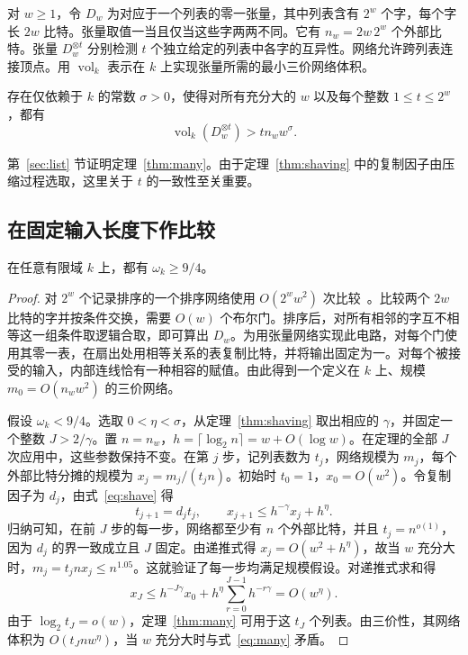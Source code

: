对 \(w\ge1\)，令 \(D_w\) 为对应于一个列表的零一张量，其中列表含有 \(2^w\) 个字，每个字长 \(2w\) 比特。张量取值一当且仅当这些字两两不同。它有 \(n_w=2w\,2^w\) 个外部比特。张量 \(D_w^{\otimes t}\) 分别检测 \(t\) 个独立给定的列表中各字的互异性。网络允许跨列表连接顶点。用 \(\operatorname{vol}_k\) 表示在 \(k\) 上实现张量所需的最小三价网络体积。

\begin{theorem}[列表互异性检测的体积]\label{thm:many}
存在仅依赖于 \(k\) 的常数 \(\sigma>0\)，使得对所有充分大的 \(w\) 以及每个整数 \(1\le t\le 2^w\)，都有
\begin{equation}\label{eq:many}
                  \operatorname{vol}_k(D_w^{\otimes t})
                          >t n_w w^\sigma .
\end{equation}
\end{theorem}

第~\ref{sec:list} 节证明定理~\ref{thm:many}。由于定理~\ref{thm:shaving} 中的复制因子由压缩过程选取，这里关于 \(t\) 的一致性至关重要。

\subsection{在固定输入长度下作比较}

\begin{proposition}\label{prop:finitefield}
在任意有限域 \(k\) 上，都有 \(\omega_k\ge 9/4\)。
\end{proposition}
\begin{proof}
对 \(2^w\) 个记录排序的一个排序网络使用 \(O(2^w w^2)\) 次比较~\citep{batcher}。比较两个 \(2w\) 比特的字并按条件交换，需要 \(O(w)\) 个布尔门。排序后，对所有相邻的字互不相等这一组条件取逻辑合取，即可算出 \(D_w\)。为用张量网络实现此电路，对每个门使用其零一表，在扇出处用相等关系的表复制比特，并将输出固定为一。对每个被接受的输入，内部连线恰有一种相容的赋值。由此得到一个定义在 \(k\) 上、规模 \(m_0=O(n_w w^2)\) 的三价网络。

假设 \(\omega_k<9/4\)。选取 \(0<\eta<\sigma\)，从定理~\ref{thm:shaving} 取出相应的 \(\gamma\)，并固定一个整数 \(J>2/\gamma\)。置 \(n=n_w\)，\(h=\lceil\log_2 n\rceil=w+O(\log w)\)。在定理的全部 \(J\) 次应用中，这些参数保持不变。在第 \(j\) 步，记列表数为 \(t_j\)，网络规模为 \(m_j\)，每个外部比特分摊的规模为 \(x_j=m_j/(t_jn)\)。初始时 \(t_0=1\)，\(x_0=O(w^2)\)。令复制因子为 \(d_j\)，由式~\eqref{eq:shave} 得
\[
         t_{j+1}=d_jt_j,\qquad
         x_{j+1}\le h^{-\gamma}x_j+h^\eta .
\]
归纳可知，在前 \(J\) 步的每一步，网络都至少有 \(n\) 个外部比特，并且 \(t_j=n^{o(1)}\)，因为 \(d_j\) 的界一致成立且 \(J\) 固定。由递推式得 \(x_j=O(w^2+h^\eta)\)，故当 \(w\) 充分大时，\(m_j=t_j n x_j\le n^{1.05}\)。这就验证了每一步均满足规模假设。对递推式求和得
\[
       x_J \le h^{-J\gamma}x_0+
                     h^\eta\sum_{r=0}^{J-1}h^{-r\gamma}
               = O(w^\eta).
\]
由于 \(\log_2 t_J=o(w)\)，定理~\ref{thm:many} 可用于这 \(t_J\) 个列表。由三价性，其网络体积为 \(O(t_J n w^\eta)\)，当 \(w\) 充分大时与式~\eqref{eq:many} 矛盾。
\end{proof}

